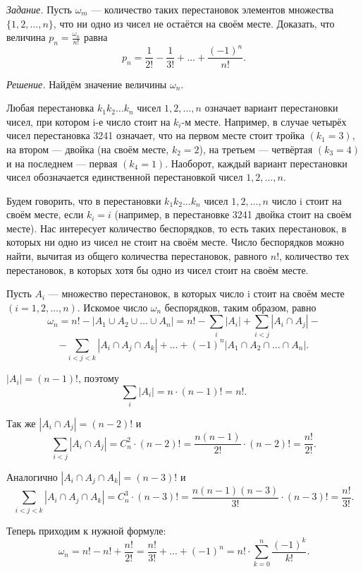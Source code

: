 \documentclass{book}
\begin{document}
\textit{Задание.} Пусть $\omega_m$ --- количество таких перестановок элементов множества $\{1, 2,  \dotsc , n\}$, что ни одно из чисел не остаётся на своём месте. Доказать, что величина $p_n=\frac{\omega_n}{n!}$ равна $$p_n=\frac{1}{2!}-\frac{1}{3!}+ \dotsc +\frac{\left(-1\right)^n}{n!}.$$

\textit{Решение.} Найдём значение величины $\omega_n$.

Любая перестановка $k_1k_2 \dotsc k_n$ чисел $1, 2,  \dotsc , n$ означает вариант перестановки чисел, при котором i-е число стоит на $k_i$-м месте. Например, в случае четырёх чисел перестановка 3241 означает, что на первом месте стоит тройка $\left(k_1=3\right)$, на втором --- двойка (на своём месте, $k_2=2$), на третьем --- четвёртая $\left(k_3=4\right)$ и на последнем --- первая $\left(k_4=1\right)$. Наоборот, каждый вариант перестановки чисел обозначается единственной перестановкой чисел $1, 2,  \dotsc , n$.

Будем говорить, что в перестановки $k_1k_2 \dotsc k_n$ чисел $1, 2,  \dotsc , n$ число i стоит на своём месте, если $k_i=i$ (например, в перестановке 3241 двойка стоит на своём месте). Нас интересует количество беспорядков, то есть таких перестановок, в которых ни одно из чисел не стоит на своём месте. Число беспорядков можно найти, вычитая из общего количества перестановок, равного $n!$, количество тех перестановок, в которых хотя бы одно из чисел стоит на своём месте.

Пусть $A_i$ --- множество перестановок, в которых число i стоит на своём месте $\left(i=1, 2,  \dotsc , n\right)$. Искомое число $\omega_n$ беспорядков, таким образом, равно $$\omega_n=n!-|A_1\cup A_2\cup \dotsc \cup A_n|=n!-\sum\limits_i|A_i|+\sum\limits_{i<j}|A_i\cap A_j|-$$$$-\sum\limits_{i<j<k}|A_i\cap A_j\cap A_k|+ \dotsc +\left(-1\right)^n|A_1\cap A_2\cap \dotsc \cap A_n|.$$

$|A_i|=\left(n-1\right)!$, поэтому $$\sum\limits_i|A_i|=n\cdot\left(n-1\right)!=n!.$$

Так же $|A_i\cap A_j|=\left(n-2\right)!$ и $$\sum\limits_{i<j}|A_i\cap A_j|=C_n^2\cdot\left(n-2\right)!=\frac{n\left(n-1\right)}{2!}\cdot\left(n-2\right)!=\frac{n!}{2!}.$$

Аналогично $|A_i\cap A_j\cap A_k|=\left(n-3\right)!$ и $$\sum\limits_{i<j<k}|A_i\cap A_j\cap A_k|=C_n^3\cdot\left(n-3\right)!=\frac{n\left(n-1\right)\left(n-3\right)}{3!}\cdot\left(n-3\right)!=\frac{n!}{3!}.$$

Теперь приходим к нужной формуле: $$\omega_n=n!-n!+\frac{n!}{2!}=\frac{n!}{3!}+ \dotsc +\left(-1\right)^n=n!\cdot\sum\limits_{k=0}^n\frac{\left(-1\right)^k}{k!}.$$
\end{document}
